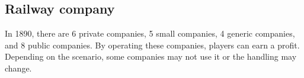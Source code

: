 \documentclass{article}
\begin{document}
\begin{CJK}{UTF8}{min}












\section{Railway company}
In 1890, there are 6 private companies, 5 small companies, 4 generic
companies, and 8 public companies. By operating these companies,
players can earn a profit. Depending on the scenario, some companies
may not use it or the handling may change.


\end{CJK}
\end{document}
